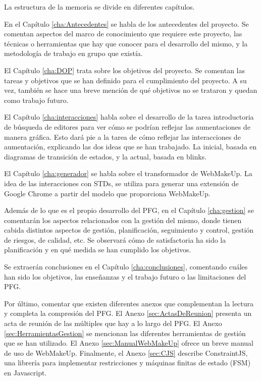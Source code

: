 La estructura de la memoria se divide en diferentes capítulos.

En el Capítulo \ref{cha:Antecedentes} se habla de los antecedentes del proyecto. Se comentan aspectos del marco de conocimiento que requiere este proyecto, las técnicas o herramientas que hay que conocer para el desarrollo del mismo, y la metodología de trabajo en grupo que existía.

El Capítulo \ref{cha:DOP} trata sobre los objetivos del proyecto. Se comentan las tareas y objetivos que se han definido para el cumplimiento del proyecto. A su vez, también se hace una breve mención de qué objetivos no se trataron y quedan como trabajo futuro.

El Capítulo \ref{cha:interacciones} habla sobre el desarrollo de la tarea introductoria de búsqueda de editores para ver cómo se podrían reflejar las aumentaciones de manera gráfica. Esto dará pie a la tarea de cómo reflejar las interacciones de aumentación, explicando las dos ideas que se han trabajado. La inicial, basada en diagramas de transición de estados, y la actual, basada en blinks.

El Capítulo \ref{cha:generador} se habla sobre el transformador de WebMakeUp. La idea de las interacciones con STDs, se utiliza para generar una extensión de Google Chrome a partir del modelo que proporciona WebMakeUp.

Además de lo que es el propio desarrollo del PFG, en el Capítulo \ref{cha:gestion} se comentarán los aspectos relacionados con la gestión del mismo, donde tienen cabida distintos aspectos de gestión, planificación, seguimiento y control, gestión de riesgos, de calidad, etc. Se observará cómo de satisfactoria ha sido la planificación y en qué medida se han cumplido los objetivos.

Se extraerán conclusiones en el Capítulo \ref{cha:conclusiones}, comentando cuáles han sido los objetivos, las enseñanzas y el trabajo futuro o las limitaciones del PFG.

Por último, comentar que existen diferentes anexos que complementan la lectura y completa la compresión del PFG. El Anexo \ref{sec:ActasDeReunion} presenta un acta de reunión de las múltiples que hay a lo largo del PFG. El Anexo \ref{sec:HerramientasGestion} se mencionan las diferentes herramientas de gestión que se han utilizado. El Anexo \ref{sec:ManualWebMakeUp} ofrece un breve manual de uso de WebMakeUp. Finalmente, el Anexo \ref{sec:CJS} describe ConstraintJS, una librería para implementar restricciones y máquinas finitas de estado (FSM) en Javascript.